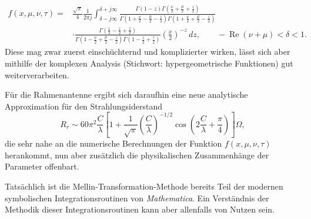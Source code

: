 \begin{align*}
    f(x, \mu, \nu, \tau)
    = &\frac{\sqrt{\pi}}{4} \frac{1}{2\pi j} 
    \int_{\delta -j\infty}^{\delta +j\infty} 
    \frac{\Gamma(1 - z)\Gamma(\frac{\nu}{2}+\frac{\mu}{2}+\frac{z}{2})}{\Gamma(1+\frac{\nu}{2}-\frac{\mu}{2}-\frac{z}{2}) \Gamma(1+\frac{\nu}{2}+\frac{\mu}{2}-\frac{z}{2})} \\
    &\cdot \frac{\Gamma(\frac{1}{2}-\frac{z}{2}+\frac{\tau}{2})}{\Gamma(1-\frac{\nu}{2}+\frac{\mu}{2}-\frac{z}{2})\Gamma(1-\frac{z}{2}+\frac{\tau}{2})} 
    \left(\frac{x}{2}\right)^{-z} \,dz,
    \qquad -\operatorname{Re}(\nu + \mu) < \delta < 1
    .
\end{align*}
Diese mag zwar zuerst einschüchternd und komplizierter wirken, lässt 
sich aber mithilfe der komplexen Analysis 
(Stichwort: hypergeometrische Funktionen) gut weiterverarbeiten.

Für die Rahmenantenne ergibt sich daraufhin eine neue analytische 
Approximation für den Strahlungsiderstand 
\[
    R_r \sim 60\pi^2 \frac{C}{\lambda}
    \left[1+\frac{1}{\sqrt{\pi}}\left(\frac{C}{\lambda}\right)^{-1/2} 
    \cos\left(2\frac{C}{\lambda}+\frac{\pi}{4}\right)\right] \Omega
    ,
\]
die sehr nahe an die numerische Berechnungen der Funktion 
$f(x, \mu, \nu, \tau)$ herankommt, nun aber zusätzlich die 
physikalischen Zusammenhänge der Parameter offenbart.
\medskip

Tatsächlich ist die Mellin-Transformation-Methode bereits Teil der  
modernen symbolischen Integrationsroutinen von {\em Mathematica}.
Ein Verständnis der Methodik dieser Integrationsroutinen kann aber
allenfalls von Nutzen sein.
